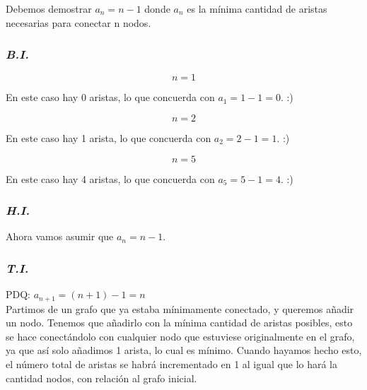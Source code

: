 \documentclass{article}
\begin{document}
Debemos demostrar $ a_n = n - 1 $ donde $ a_n $ es la mínima cantidad de aristas
necesarias para conectar n nodos.

\subsubsection*{\emph{B.I.}}
\[ n = 1 \]

\begin{center}
\end{center}
En este caso hay 0 aristas, lo que concuerda con $a_1 = 1 - 1 = 0$. :)

\[ n = 2 \]

\begin{center}
\end{center}
En este caso hay 1 arista, lo que concuerda con $a_2 = 2 - 1 = 1$. :)


\[ n = 5 \]

\begin{center}
\end{center}
En este caso hay 4 aristas, lo que concuerda con $a_5 = 5 - 1 = 4$. :)

\subsubsection*{\emph{H.I.}}
Ahora vamos asumir que $ a_n = n - 1 $.

\subsubsection*{\emph{T.I.}}
PDQ: $a_{n+1} = (n + 1) -1 = n$ \\
Partimos de un grafo que ya estaba mínimamente conectado, y queremos añadir un
nodo. Tenemos que añadirlo con la mínima cantidad de aristas posibles, esto se
hace conectándolo con cualquier nodo que estuviese originalmente en el grafo,
ya que así solo añadimos 1 arista, lo cual es mínimo. Cuando hayamos hecho
esto, el número total de aristas se habrá incrementado en 1 al igual que lo
hará la cantidad nodos, con relación al grafo inicial.
\end{document}

